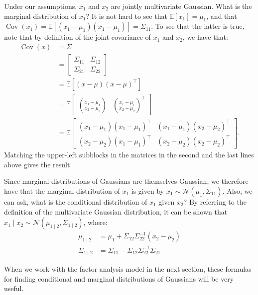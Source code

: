 Under our assumptions, $x_1$ and $x_2$ are jointly multivariate Gaussian.
What is the marginal distribution of $x_1$? It is not hard to see that $\mathbb E[x_1] = \mu_1$,
and that $\operatorname{Cov}(x_1) = \mathbb E[(x_1 - \mu_1)(x_1 - \mu_1)] = \Sigma_{11}$. To see that the latter is
true, note that by definition of the joint covariance of $x_1$ and $x_2$, we have
that:
\begin{align*}
    \operatorname{Cov}(x) &= \Sigma\\
        &= \begin{bmatrix}
            \Sigma_{11} & \Sigma_{12}\\
            \Sigma_{21} & \Sigma_{22}
        \end{bmatrix}\\
        &= \mathbb E[(x - \mu )(x - \mu)^\top]\\
        &= \mathbb E \begin{bmatrix} 
            \binom{x_1 - \mu_1}{x_2 - \mu_2} & \binom{x_1 - \mu_1}{x_2 - \mu_2}^\top
        \end{bmatrix}\\
    &= \mathbb E
    \begin{bmatrix}
        (x_1 - \mu_1)(x_1 - \mu_1)^\top & (x_1 - \mu_1)(x_2 - \mu_2)^\top\\
        (x_2 - \mu_2)(x_1 - \mu_1)^\top & (x_2 - \mu_2)(x_2 - \mu_2)^\top
    \end{bmatrix}.
\end{align*}
Matching the upper-left subblocks in the matrices in the second and the last
lines above gives the result.

Since marginal distributions of Gaussians are themselves Gaussian, we
therefore have that the marginal distribution of $x_1$ is given by $x_1 \sim \mathcal N (\mu_1, \Sigma_{11})$.
Also, we can ask, what is the conditional distribution of $x_1$ given $x_2$? By
referring to the definition of the multivariate Gaussian distribution, it can
be shown that $x_1 \mid x_2 \sim \mathcal N (\mu_{1 \mid 2}, \Sigma_{1 \mid 2})$, where:
\begin{align}
    \mu_{1 \mid 2} &= \mu_1 + \Sigma_{12}\Sigma^{-1}_22 (x_2 - \mu_2)\label{eq:conditional_mu}\\
    \Sigma_{1 \mid 2} &= \Sigma_{11} - \Sigma_{12}\Sigma^{-1}_22 \Sigma_{21}\label{eq:conditional_Sigma}
\end{align}

When we work with the factor analysis model in the next section, these
formulas for finding conditional and marginal distributions of Gaussians will
be very useful.

